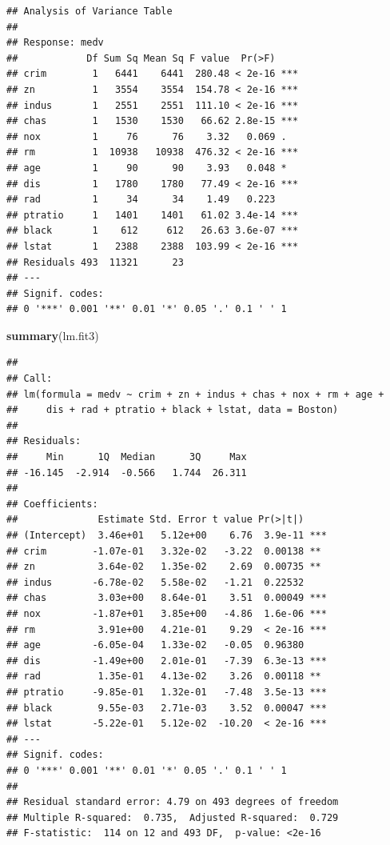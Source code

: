 \documentclass[]{book}
\newenvironment{Shaded}{\begin{snugshade}}{\end{snugshade}}
\newcommand{\KeywordTok}[1]{\textcolor[rgb]{0.13,0.29,0.53}{\textbf{#1}}}
\newcommand{\NormalTok}[1]{#1}
\theoremstyle{definition}
\theoremstyle{definition}
\theoremstyle{definition}
\theoremstyle{remark}
\begin{document}
\begin{verbatim}
## Analysis of Variance Table
## 
## Response: medv
##            Df Sum Sq Mean Sq F value  Pr(>F)    
## crim        1   6441    6441  280.48 < 2e-16 ***
## zn          1   3554    3554  154.78 < 2e-16 ***
## indus       1   2551    2551  111.10 < 2e-16 ***
## chas        1   1530    1530   66.62 2.8e-15 ***
## nox         1     76      76    3.32   0.069 .  
## rm          1  10938   10938  476.32 < 2e-16 ***
## age         1     90      90    3.93   0.048 *  
## dis         1   1780    1780   77.49 < 2e-16 ***
## rad         1     34      34    1.49   0.223    
## ptratio     1   1401    1401   61.02 3.4e-14 ***
## black       1    612     612   26.63 3.6e-07 ***
## lstat       1   2388    2388  103.99 < 2e-16 ***
## Residuals 493  11321      23                    
## ---
## Signif. codes:  
## 0 '***' 0.001 '**' 0.01 '*' 0.05 '.' 0.1 ' ' 1
\end{verbatim}

\begin{Shaded}
\begin{Highlighting}[]
\KeywordTok{summary}\NormalTok{(lm.fit3)}
\end{Highlighting}
\end{Shaded}

\begin{verbatim}
## 
## Call:
## lm(formula = medv ~ crim + zn + indus + chas + nox + rm + age + 
##     dis + rad + ptratio + black + lstat, data = Boston)
## 
## Residuals:
##     Min      1Q  Median      3Q     Max 
## -16.145  -2.914  -0.566   1.744  26.311 
## 
## Coefficients:
##              Estimate Std. Error t value Pr(>|t|)    
## (Intercept)  3.46e+01   5.12e+00    6.76  3.9e-11 ***
## crim        -1.07e-01   3.32e-02   -3.22  0.00138 ** 
## zn           3.64e-02   1.35e-02    2.69  0.00735 ** 
## indus       -6.78e-02   5.58e-02   -1.21  0.22532    
## chas         3.03e+00   8.64e-01    3.51  0.00049 ***
## nox         -1.87e+01   3.85e+00   -4.86  1.6e-06 ***
## rm           3.91e+00   4.21e-01    9.29  < 2e-16 ***
## age         -6.05e-04   1.33e-02   -0.05  0.96380    
## dis         -1.49e+00   2.01e-01   -7.39  6.3e-13 ***
## rad          1.35e-01   4.13e-02    3.26  0.00118 ** 
## ptratio     -9.85e-01   1.32e-01   -7.48  3.5e-13 ***
## black        9.55e-03   2.71e-03    3.52  0.00047 ***
## lstat       -5.22e-01   5.12e-02  -10.20  < 2e-16 ***
## ---
## Signif. codes:  
## 0 '***' 0.001 '**' 0.01 '*' 0.05 '.' 0.1 ' ' 1
## 
## Residual standard error: 4.79 on 493 degrees of freedom
## Multiple R-squared:  0.735,  Adjusted R-squared:  0.729 
## F-statistic:  114 on 12 and 493 DF,  p-value: <2e-16
\end{verbatim}
\end{document}
